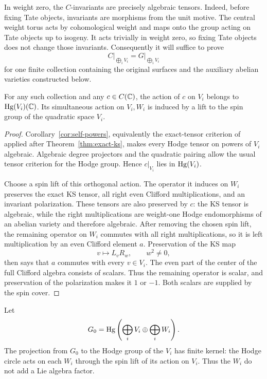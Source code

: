 In weight zero, the $C$-invariants are precisely algebraic tensors.
Indeed, before fixing Tate objects, invariants are morphisms from the
unit motive.  The central weight torus acts by cohomological weight and
maps onto the group acting on Tate objects up to isogeny.  It acts
trivially in weight zero, so fixing Tate objects does not change those
invariants.  Consequently it will suffice to prove
\begin{equation}\label{eq:mixed-group-goal}
 C\big|_{\bigoplus_i V_i}=G\big|_{\bigoplus_i V_i}
\end{equation}
for one finite collection containing the original surfaces and the
auxiliary abelian varieties constructed below.

\begin{lemma}\label{lem:mixed-individual}
For any such collection and any $c\in C(\mathbb C)$, the action of $c$ on $V_i$
belongs to $\operatorname{Hg}(V_i)(\mathbb C)$.  Its simultaneous action on $V_i,W_i$ is
induced by a lift to the spin group of the quadratic space $V_i$.
\end{lemma}

\begin{proof}
Corollary~\ref{cor:self-powers}, equivalently the exact-tensor criterion
of \cite[Theorem~1.1]{AKS} applied after
Theorem~\ref{thm:exact-ks}, makes every Hodge tensor on powers of $V_i$
algebraic.  Algebraic degree projectors and the quadratic pairing allow
the usual tensor criterion for the Hodge group.  Hence $c|_{V_i}$ lies
in $\operatorname{Hg}(V_i)$.

Choose a spin lift of this orthogonal action.  The operator it induces
on $W_i$ preserves the exact KS tensor, all right even Clifford
multiplications, and an invariant polarization.  These tensors are
also preserved by $c$: the KS tensor is algebraic, while the right
multiplications are weight-one Hodge endomorphisms of an abelian
variety and therefore algebraic.  After removing the chosen spin lift,
the remaining operator on $W_i$ commutes with all right multiplications,
so it is left multiplication by an even Clifford element $a$.
Preservation of the KS map
\[
 v\longmapsto L_vR_w,\qquad w^2\ne0,
\]
then says that $a$ commutes with every $v\in V_i$.  The even part of
the center of the full Clifford algebra consists of scalars.  Thus the
remaining operator is scalar, and preservation of the polarization
makes it $1$ or $-1$.  Both scalars are supplied by the spin cover.
\end{proof}

Let
\[
 G_0=\operatorname{Hg}\left(\bigoplus_i V_i\oplus\bigoplus_i W_i\right).
\]
The projection from $G_0$ to the Hodge group of the $V_i$ has finite
kernel: the Hodge circle acts on each $W_i$ through the spin lift of
its action on $V_i$.  Thus the $W_i$ do not add a Lie algebra factor.

